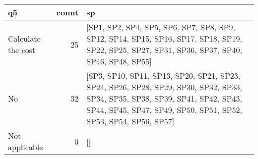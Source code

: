 \begin{tabular}{lrl}
\toprule
                 q5 &  count &                                                                                                                                                                                               sp \\
\midrule
 Calculate the cost &     25 &                                                   [SP1, SP2, SP4, SP5, SP6, SP7, SP8, SP9, SP12, SP14, SP15, SP16, SP17, SP18, SP19, SP22, SP25, SP27, SP31, SP36, SP37, SP40, SP46, SP48, SP55] \\
                 No &     32 &  [SP3, SP10, SP11, SP13, SP20, SP21, SP23, SP24, SP26, SP28, SP29, SP30, SP32, SP33, SP34, SP35, SP38, SP39, SP41, SP42, SP43, SP44, SP45, SP47, SP49, SP50, SP51, SP52, SP53, SP54, SP56, SP57] \\
     Not applicable &      0 &                                                                                                                                                                                               [] \\
\bottomrule
\end{tabular}
